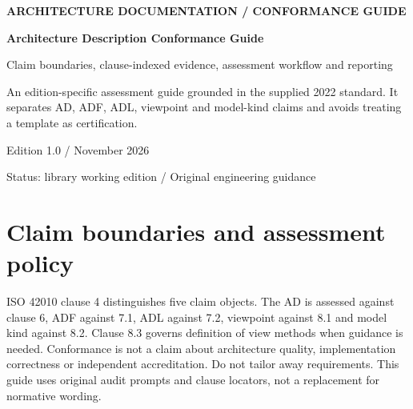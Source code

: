 \documentclass[11pt,letterpaper]{article}
\newcommand{\docsection}[1]{\Needspace{5\baselineskip}\section{#1}}
\begin{document}
\begin{titlepage}\thispagestyle{empty}\raggedright
\vspace*{0.65in}
{\sffamily\bfseries\color{teal} ARCHITECTURE DOCUMENTATION / CONFORMANCE GUIDE\par}
\vspace{0.35in}
{\sffamily\bfseries\color{navy}\Huge Architecture Description Conformance Guide\par}
\vspace{0.2in}
{\sffamily\Large\color{muted} Claim boundaries, clause-indexed evidence, assessment workflow and reporting\par}
\vspace{0.35in}\noindent{\color{teal}\rule{\linewidth}{1.5pt}}\par
\vspace{0.3in}
An edition-specific assessment guide grounded in the supplied 2022 standard. It separates AD, ADF, ADL, viewpoint and model-kind claims and avoids treating a template as certification.

\vfill
{\sffamily\small Edition 1.0 \quad /  November 2026\par
Status: library working edition \quad / \quad Original engineering guidance\par}
\end{titlepage}
\tableofcontents\clearpage
\docsection{Claim boundaries and assessment policy}
ISO 42010 clause 4 distinguishes five claim objects. The AD is assessed against clause 6, ADF against 7.1, ADL against 7.2, viewpoint against 8.1 and model kind against 8.2. Clause 8.3 governs definition of view methods when guidance is needed. Conformance is not a claim about architecture quality, implementation correctness or independent accreditation. Do not tailor away requirements. This guide uses original audit prompts and clause locators, not a replacement for normative wording.
\end{document}
